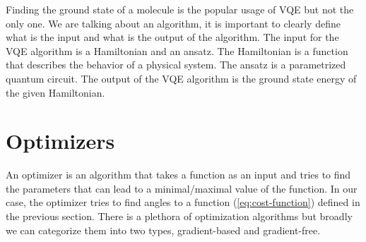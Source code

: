 Finding the ground state of a molecule is the popular usage of VQE but not the only one.
We are talking about an algorithm, it is important to clearly define what is the input and what is the output of the algorithm. The input for the VQE algorithm is a Hamiltonian and an ansatz. The Hamiltonian is a function that describes the behavior of a physical system. The ansatz is a parametrized quantum circuit. The output of the VQE algorithm is the ground state energy of the given Hamiltonian.


\section{Optimizers}
An optimizer is an algorithm that takes a function as an input and tries to find the parameters that can lead to a minimal/maximal value of the function. In our case, the optimizer tries to find angles to a function (\ref{eq:cost-function}) defined in the previous section. There is a plethora of optimization algorithms but broadly we can categorize them into two types, gradient-based and gradient-free.

